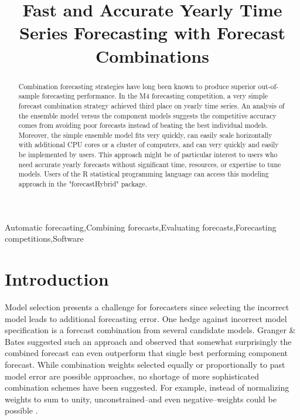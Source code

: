 \documentclass[11pt,3p,review,authoryear]{elsarticle}
\begin{document}
\begin{frontmatter}

\title{Fast and Accurate Yearly Time Series Forecasting with Forecast Combinations}





\begin{abstract}
Combination forecasting strategies have long been known to produce superior out-of-sample forecasting performance. In the M4 forecasting competition, a very simple forecast combination strategy achieved third place on yearly time series. An analysis of the ensemble model versus the component models suggests the competitive accuracy comes from avoiding poor forecasts instead of beating the best individual models. Moreover, the simple ensemble model fits very quickly, can easily scale horizontally with additional CPU cores or a cluster of computers, and can very quickly and easily be implemented by users. This approach might be of particular interest to users who need accurate yearly forecasts without significant time, resources, or expertise to tune models. Users of the R statistical programming language can access this modeling approach in the "forecastHybrid" package.
\end{abstract}

\begin{keyword}
Automatic forecasting\sep Combining forecasts\sep Evaluating forecasts\sep Forecasting competitions\sep Software
\end{keyword}

\end{frontmatter}


\section{Introduction}
Model selection presents a challenge for forecasters since selecting the incorrect model leads to additional forecasting error. One hedge against incorrect model specification is a forecast combination from several candidate models. Granger \& Bates \cite{BatesGranger1969} suggested such an approach and observed that somewhat surprisingly the combined forecast can even outperform that single best performing component forecast. While combination weights selected equally or proportionally to past model error are possible approaches, no shortage of more sophisticated combination schemes have been suggested. For example, instead of normalizing weights to sum to unity, unconstrained--and even negative--weights could be possible \citep{GrangerRamanathan1984}.
\end{document}
